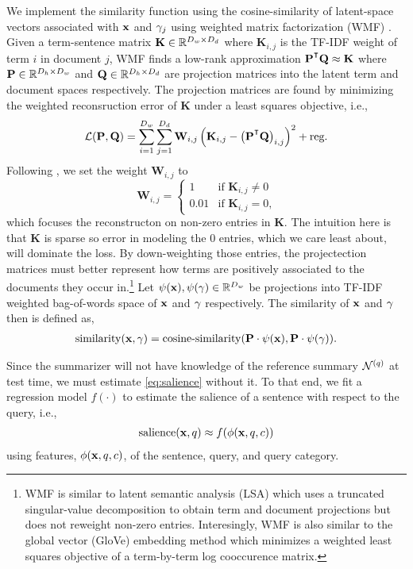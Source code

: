 We implement the similarity function using the cosine-similarity of
latent-space vectors associated with $\mathbf{x}$ and $\gamma_j$ using
weighted matrix factorization (WMF) \citep{srebro2003,guo2012}. Given a
term-sentence matrix $\mathbf{K} \in \mathbb{R}^{D_{w} \times D_{d}}$ where
$\mathbf{K}_{i,j}$ is the TF-IDF weight of term $i$ in document $j$, WMF finds
a low-rank approximation $\mathbf{P}^\T\mathbf{Q} \approx \mathbf{K}$ where
$\mathbf{P} \in \mathbb{R}^{D_h\times D_w}$ and $\mathbf{Q} \in \mathbb{R}^{D_h\times
D_d}$ are projection matrices into the latent term and document  spaces
respectively.  The projection matrices are found by minimizing the weighted
reconsruction error of $\mathbf{K}$ under a least squares objective, i.e.,
\[\mathcal{L}(\mathbf{P},\mathbf{Q}) = \sum_{i=1}^{D_w}\sum_{j=1}^{D_d}
\mathbf{W}_{i,j} \left( \mathbf{K}_{i,j} - \left(\mathbf{P}^\T
\mathbf{Q}\right)_{i,j}\right)^2 + \textrm{reg.}\] Following \cite{guo2012},
we set the weight $\mathbf{W}_{i,j}$ to \[ \mathbf{W}_{i,j} = \begin{cases} 1
& \textrm{if $\mathbf{K}_{i,j} \ne 0$}\\ 0.01 & \textrm{if $\mathbf{K}_{i,j} =
0$,}   \end{cases}\] which focuses the reconstructon on non-zero entries in
$\mathbf{K}$. The intuition here is that $\mathbf{K}$ is sparse so error in
modeling the 0 entries, which we care least about, will dominate the loss. By
down-weighting those entries, the projectection matrices must better represent
how terms are positively associated to the documents they occur
in.\footnote{WMF is similar to latent semantic analysis (LSA)
\citep{dumais1988} which uses a truncated singular-value decomposition to
obtain term and document projections but does not reweight non-zero entries.
Interesingly, WMF is also similar to the global vector (GloVe) embedding
method \citep{pennington2014glove} which minimizes a weighted least squares
objective of a term-by-term log cooccurence matrix.} Let
$\psi(\mathbf{x}),\psi(\gamma) \in \mathbb{R}^{D_w}$ be projections into
TF-IDF weighted bag-of-words space of $\mathbf{x}$ and $\gamma$
respectively. The similarity of $\mathbf{x}$ and $\gamma$ then is
defined as, \begin{align}\operatorname{similarity}(\mathbf{x},\gamma) =
\operatorname{cosine-similarity}(\mathbf{P}\cdot \psi(\mathbf{x}),
\mathbf{P}\cdot\psi(\gamma)). \label{eq:semsim} \end{align}

Since the summarizer will not have knowledge of the reference summary
$\mathcal{N}^{(q)}$ at test time, we must estimate \autoref{eq:salience}
without it. To that end, we fit a regression model $f(\cdot)$ to estimate the
salience of a sentence with respect to the query, i.e., \begin{align}
\operatorname{salience}(\mathbf{x}, q) \approx
f(\phi(\mathbf{x},q,c))\label{eq:approxsal} \end{align} using features,
$\phi(\mathbf{x},q,c)$, of the sentence, query, and query
category.



